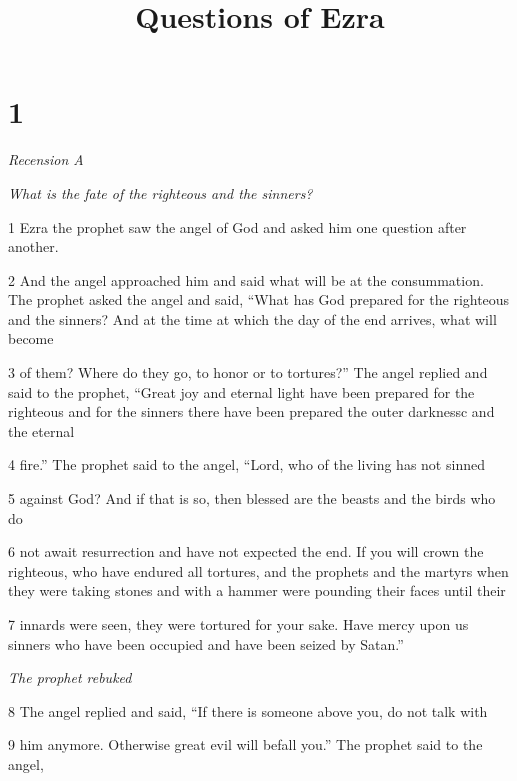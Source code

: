 

\title{Questions of Ezra}

\chapter{1}

\par \textit{Recension A}

\par \textit{What is the fate of the righteous and the sinners?}

\par 1 Ezra the prophet saw the angel of God and asked him one question after another.

\par 2 And the angel approached him and said what will be at the consummation. The prophet asked the angel and said, “What has God prepared for the righteous and the sinners? And at the time at which the day of the end arrives, what will become

\par 3 of them? Where do they go, to honor or to tortures?” The angel replied and said to the prophet, “Great joy and eternal light have been prepared for the righteous and for the sinners there have been prepared the outer darknessc and the eternal

\par 4 fire.” The prophet said to the angel, “Lord, who of the living has not sinned

\par 5 against God? And if that is so, then blessed are the beasts and the birds who do

\par 6 not await resurrection and have not expected the end. If you will crown the righteous, who have endured all tortures, and the prophets and the martyrs when they were taking stones and with a hammer were pounding their faces until their

\par 7 innards were seen, they were tortured for your sake. Have mercy upon us sinners who have been occupied and have been seized by Satan.”

\par \textit{The prophet rebuked}

\par 8 The angel replied and said, “If there is someone above you, do not talk with

\par 9 him anymore. Otherwise great evil will befall you.” The prophet said to the angel,

